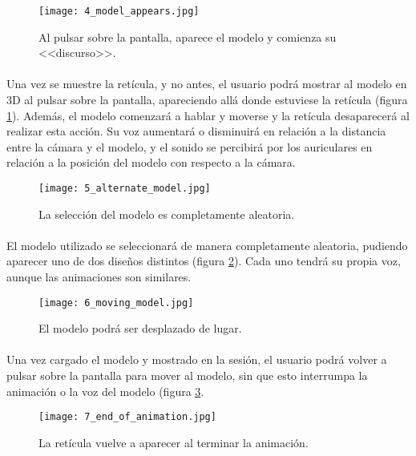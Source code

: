 \documentclass{subfiles}
\begin{document}
\begin{figure}[H]
\centering
\texttt{[image: 4\_model\_appears.jpg]}
\caption{Al pulsar sobre la pantalla, aparece el modelo y comienza su <<discurso>>.}
\label{fig:4_model_appears}
\end{figure}

        \paragraph{}
        Una vez se muestre la retícula, y no antes, el usuario podrá mostrar al modelo en 3D al pulsar sobre la pantalla, apareciendo allá donde estuviese la retícula (figura \ref{fig:4_model_appears}). Además, el modelo comenzará a hablar y moverse y la retícula desaparecerá al realizar esta acción. Su voz aumentará o disminuirá en relación a la distancia entre la cámara y el modelo, y el sonido se percibirá por los auriculares en relación a la posición del modelo con respecto a la cámara.

\begin{figure}[H]
\centering
\texttt{[image: 5\_alternate\_model.jpg]}
\caption{La selección del modelo es completamente aleatoria.}
\label{fig:5_alternate_model}
\end{figure}

        \paragraph{}
        El modelo utilizado se seleccionará de manera completamente aleatoria, pudiendo aparecer uno de dos diseños distintos (figura \ref{fig:5_alternate_model}). Cada uno tendrá su propia voz, aunque las animaciones son similares.

\begin{figure}[H]
\centering
\texttt{[image: 6\_moving\_model.jpg]}
\caption{El modelo podrá ser desplazado de lugar.}
\label{fig:6_moving_model}
\end{figure}

        \paragraph{}
        Una vez cargado el modelo y mostrado en la sesión, el usuario podrá volver a pulsar sobre la pantalla para mover al modelo, sin que esto interrumpa la animación o la voz del modelo (figura \ref{fig:6_moving_model}.

\begin{figure}[H]
\centering
\texttt{[image: 7\_end\_of\_animation.jpg]}
\caption{La retícula vuelve a aparecer al terminar la animación.}
\label{fig:7_end_of_animation}
\end{figure}
\end{document}
